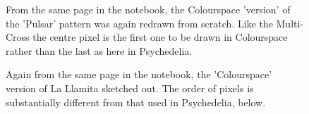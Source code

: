 \begin{figure}[H]
    \centering
    \begin{adjustbox}{width=7cm,center}
    \end{adjustbox}
\caption{
  From the same page in the notebook, the Colourspace 'version' of the 'Pulsar' pattern was again redrawn from scratch. Like the
  Multi-Cross the centre pixel is the first one to be drawn in Colourspace rather than the last as here in Psychedelia.
  }
\end{figure}
\begin{figure}[H]
    \centering
    \begin{adjustbox}{width=8cm,center}
    \end{adjustbox}
\caption{
  Again from the same page in the notebook, the 'Colourspace' version of La Llamita sketched out. The order of pixels is substantially
  different from that used in Psychedelia, below.
  }
\end{figure}
\vspace{1cm}

